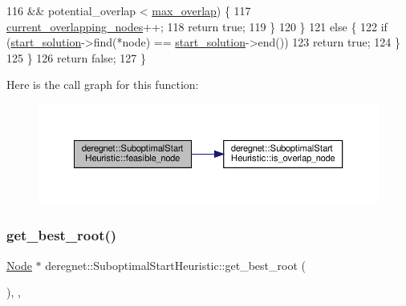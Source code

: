 \begin{DoxyCode}
116                 && potential\_overlap < \hyperlink{classderegnet_1_1SuboptimalStartHeuristic_ab7da09c5dc0c3fd13e19d254319ab3ba}{max\_overlap}) \{
117                 \hyperlink{classderegnet_1_1SuboptimalStartHeuristic_a422ca9127a469117bab51ae3eb2fbdcf}{current\_overlapping\_nodes}++;
118                 \textcolor{keywordflow}{return} \textcolor{keyword}{true};
119             \}
120         \}
121         \textcolor{keywordflow}{else} \{
122             \textcolor{keywordflow}{if} (\hyperlink{classderegnet_1_1DeregnetStartHeuristic_a7450e11ca0a265b055f95e7832b65e2f}{start\_solution}->find(*node) == \hyperlink{classderegnet_1_1DeregnetStartHeuristic_a7450e11ca0a265b055f95e7832b65e2f}{start\_solution}->end())
123                 \textcolor{keywordflow}{return} \textcolor{keyword}{true};
124         \}
125     \}
126     \textcolor{keywordflow}{return} \textcolor{keyword}{false};
127 \}
\end{DoxyCode}
Here is the call graph for this function\+:\nopagebreak
\begin{figure}[H]
\begin{center}
\leavevmode
\includegraphics[width=350pt]{classderegnet_1_1SuboptimalStartHeuristic_acbd151d7620495d80be8c63f1d3c4ecb_cgraph}
\end{center}
\end{figure}
\mbox{\label{classderegnet_1_1SuboptimalStartHeuristic_aaa8bad0a658a0e1de5e849a5fb58aa21}} 
\subsubsection{\texorpdfstring{get\+\_\+best\+\_\+root()}{get\_best\_root()}}
{\footnotesize\ttfamily \hyperlink{namespacederegnet_a744bad34f2de9856d36715a445f027f3}{Node} $\ast$ deregnet\+::\+Suboptimal\+Start\+Heuristic\+::get\+\_\+best\+\_\+root (\begin{DoxyParamCaption}{ }\end{DoxyParamCaption})\hspace{0.3cm}{\ttfamily [override]}, {\ttfamily [private]}, {\ttfamily [virtual]}}



